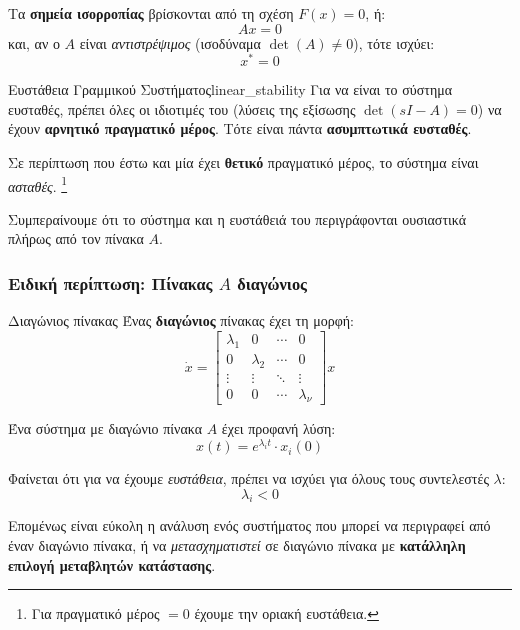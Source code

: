 \documentclass[11pt,a4paper,notitlepage,fleqn]{article}
\begin{document}
Τα \textbf{σημεία ισορροπίας} βρίσκονται από τη σχέση \( F(x) = 0 \), ή:
\[
Ax = 0
\]
και, αν ο \( A \) είναι \textit{αντιστρέψιμος} (ισοδύναμα \( \det(A)\neq 0 \)), τότε ισχύει:\[
x^* = 0
\]

\begin{theorem}{Ευστάθεια Γραμμικού Συστήματος}{linear_stability}
	Για να είναι το σύστημα ευσταθές,
	πρέπει όλες οι ιδιοτιμές του (λύσεις της εξίσωσης \( \det(sI-A)=0 \)) να έχουν
	\textbf{αρνητικό πραγματικό μέρος}. Τότε είναι πάντα \textbf{ασυμπτωτικά ευσταθές}.

	Σε περίπτωση που έστω και μία έχει \textbf{θετικό} πραγματικό
	μέρος, το σύστημα είναι \textit{ασταθές}. \footnote{Για πραγματικό μέρος
		\( =0 \) έχουμε την οριακή ευστάθεια.}

\end{theorem}

Συμπεραίνουμε ότι το σύστημα και η ευστάθειά του περιγράφονται ουσιαστικά πλήρως
από τον πίνακα \( A \).

\subsubsection{Ειδική περίπτωση: Πίνακας \( A \) διαγώνιος}
\begin{defn}{Διαγώνιος πίνακας}{}
	Ένας \textbf{διαγώνιος} πίνακας έχει τη μορφή:\[
	\dot x = \left[\begin{matrix}
	\lambda_1 & 0 & \cdots & 0 \\
	0 & \lambda_2 & \cdots & 0 \\
	\vdots & \vdots & \ddots & \vdots \\
	0 & 0 & \cdots & \lambda_\nu
	\end{matrix}
	\right] x
	\]
\end{defn}

Ένα σύστημα με διαγώνιο πίνακα \( A \) έχει προφανή λύση:
\[
x(t) = e^{\lambda_i t} \cdot x_i(0)
\]

Φαίνεται ότι για να έχουμε \textit{ευστάθεια}, πρέπει να ισχύει για όλους τους
συντελεστές \( \lambda \):
\[
\lambda_i < 0
\]

Επομένως είναι εύκολη η ανάλυση ενός συστήματος που μπορεί να περιγραφεί από
έναν διαγώνιο πίνακα, ή να \textit{μετασχηματιστεί} σε διαγώνιο πίνακα
με \textbf{κατάλληλη επιλογή μεταβλητών κατάστασης}.
\end{document}
